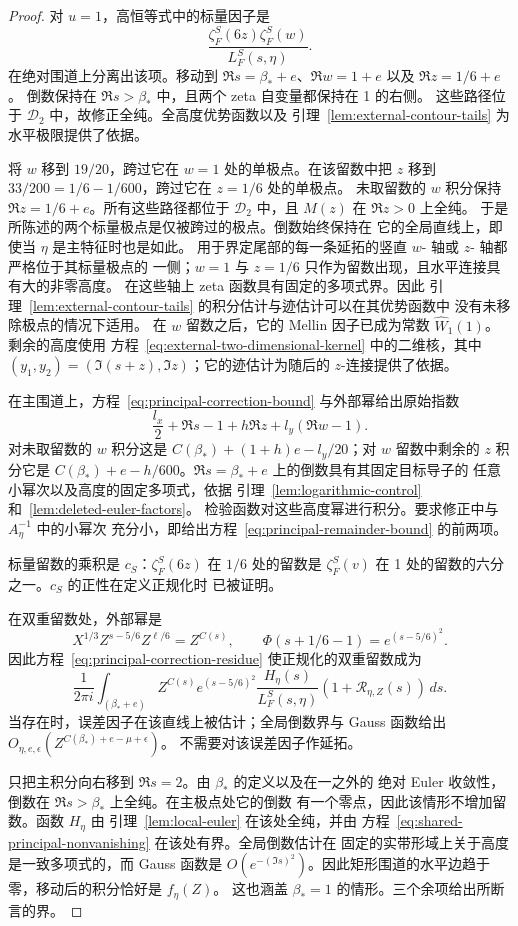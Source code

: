 \begin{proof}
对 $u=1$，高恒等式中的标量因子是
\[
 \frac{\zeta_F^S(6z)\zeta_F^S(w)}{L_F^S(s,\eta)}.
\]
在绝对围道上分离出该项。移动到
$\Re s=\beta_*+e$、$\Re w=1+e$ 以及 $\Re z=1/6+e$。
倒数保持在 $\Re s>\beta_*$ 中，且两个 zeta 自变量都保持在 1 的右侧。
这些路径位于 $\mathcal D_2$ 中，故修正全纯。全高度优势函数以及
引理~\ref{lem:external-contour-tails} 为水平极限提供了依据。

将 $w$ 移到 $19/20$，跨过它在 $w=1$ 处的单极点。在该留数中把 $z$ 移到
$33/200=1/6-1/600$，跨过它在 $z=1/6$ 处的单极点。
未取留数的 $w$ 积分保持 $\Re z=1/6+e$。所有这些路径都位于
$\mathcal D_2$ 中，且 $M(z)$ 在 $\Re z>0$ 上全纯。
于是所陈述的两个标量极点是仅被跨过的极点。倒数始终保持在
它的全局直线上，即使当 $\eta$ 是主特征时也是如此。
用于界定尾部的每一条延拓的竖直 $w$- 轴或 $z$- 轴都严格位于其标量极点的
一侧；$w=1$ 与 $z=1/6$ 只作为留数出现，且水平连接具有大的非零高度。
在这些轴上 zeta 函数具有固定的多项式界。因此
引理~\ref{lem:external-contour-tails} 的积分估计与迹估计可以在其优势函数中
没有未移除极点的情况下适用。
在 $w$ 留数之后，它的 Mellin 因子已成为常数
$\widehat W_1(1)$。剩余的高度使用
方程~\eqref{eq:external-two-dimensional-kernel} 中的二维核，其中
$(y_1,y_2)=(\Im(s+z),\Im z)$；它的迹估计为随后的 $z$-连接提供了依据。

在主围道上，方程~\eqref{eq:principal-correction-bound} 与外部幂给出原始指数
\[
 \frac{l_x}{2}+\Re s-1+h\Re z+l_y(\Re w-1).
\]
对未取留数的 $w$ 积分这是
$C(\beta_*)+(1+h)e-l_y/20$；对 $w$ 留数中剩余的 $z$ 积分它是
$C(\beta_*)+e-h/600$。$\Re s=\beta_*+e$ 上的倒数具有其固定目标导子的
任意小幂次以及高度的固定多项式，依据
引理~\ref{lem:logarithmic-control} 和~\ref{lem:deleted-euler-factors}。
检验函数对这些高度幂进行积分。要求修正中与 $A_\eta^{-1}$ 中的小幂次
充分小，即给出方程~\eqref{eq:principal-remainder-bound} 的前两项。

标量留数的乘积是 $c_S$：$\zeta_F^S(6z)$ 在 $1/6$ 处的留数是
$\zeta_F^S(v)$ 在 1 处的留数的六分之一。$c_S$ 的正性在定义正规化时
已被证明。

在双重留数处，外部幂是
\[
 X^{1/3}Z^{s-5/6}Z^{\ell/6}=Z^{C(s)},
 \qquad \Phi(s+1/6-1)=e^{(s-5/6)^2}.
\]
因此方程~\eqref{eq:principal-correction-residue} 使正规化的双重留数成为
\[
 \frac1{2\pi i}\int_{(\beta_*+e)}
 Z^{C(s)}e^{(s-5/6)^2}\frac{H_\eta(s)}{L_F^S(s,\eta)}
          (1+\mathcal R_{\eta,Z}(s))\,ds.
\]
当存在时，误差因子在该直线上被估计；全局倒数界与 Gauss 函数给出
$O_{\eta,e,\epsilon}(Z^{C(\beta_*)+e-\mu+\epsilon})$。
不需要对该误差因子作延拓。

只把主积分向右移到 $\Re s=2$。由 $\beta_*$ 的定义以及在一之外的
绝对 Euler 收敛性，倒数在 $\Re s>\beta_*$ 上全纯。在主极点处它的倒数
有一个零点，因此该情形不增加留数。函数 $H_\eta$ 由
引理~\ref{lem:local-euler} 在该处全纯，并由
方程~\eqref{eq:shared-principal-nonvanishing} 在该处有界。全局倒数估计在
固定的实带形域上关于高度是一致多项式的，而 Gauss 函数是
$O(e^{-(\Im s)^2})$。因此矩形围道的水平边趋于零，移动后的积分恰好是
$f_\eta(Z)$。
这也涵盖 $\beta_*=1$ 的情形。三个余项给出所断言的界。
\end{proof}


